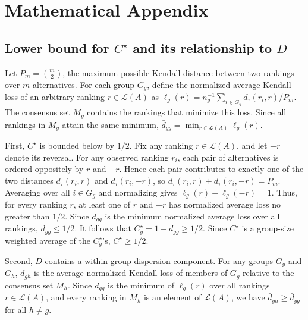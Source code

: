 \documentclass[12pt]{article}
\begin{document}


\printbibliography

\appendix


\section{Mathematical Appendix}

\subsection{Lower bound for \(C^{\star}\) and its relationship to \(D\)}
\label{app:c-d-relationship}

Let \(P_m=\binom{m}{2}\), the maximum possible Kendall distance between two
rankings over \(m\) alternatives. For each group \(G_g\), define the normalized
average Kendall loss of an arbitrary ranking \(r\in\mathcal{L}(A)\) as
\(\ell_g(r)=n_g^{-1}\sum_{i\in G_g}d_{\tau}(r_i,r)/P_m\). The consensus set
\(M_g\) contains the rankings that minimize this loss. Since all rankings in
\(M_g\) attain the same minimum, \(\bar d_{gg}=\min_{r\in\mathcal{L}(A)}
\ell_g(r)\).

First, \(C^{\star}\) is bounded below by \(1/2\). Fix any ranking
\(r\in\mathcal{L}(A)\), and let \(-r\) denote its reversal. For any observed
ranking \(r_i\), each pair of alternatives is ordered oppositely by \(r\) and
\(-r\). Hence each pair contributes to exactly one of the two distances
\(d_{\tau}(r_i,r)\) and \(d_{\tau}(r_i,-r)\), so
\(d_{\tau}(r_i,r)+d_{\tau}(r_i,-r)=P_m\). Averaging over all \(i\in G_g\) and
normalizing gives \(\ell_g(r)+\ell_g(-r)=1\). Thus, for every ranking \(r\), at
least one of \(r\) and \(-r\) has normalized average loss no greater than
\(1/2\). Since \(\bar d_{gg}\) is the minimum normalized average loss over all
rankings, \(\bar d_{gg}\leq 1/2\). It follows that
\(C_g^{\star}=1-\bar d_{gg}\geq 1/2\). Since \(C^{\star}\) is a group-size
weighted average of the \(C_g^{\star}\)'s, \(C^{\star}\geq 1/2\).

Second, \(D\) contains a within-group dispersion component. For any groups
\(G_g\) and \(G_h\), \(\bar d_{gh}\) is the average normalized Kendall loss of
members of \(G_g\) relative to the consensus set \(M_h\). Since \(\bar d_{gg}\)
is the minimum of \(\ell_g(r)\) over all rankings \(r\in\mathcal{L}(A)\), and
every ranking in \(M_h\) is an element of \(\mathcal{L}(A)\), we have
\(\bar d_{gh}\geq \bar d_{gg}\) for all \(h\neq g\).
\end{document}
